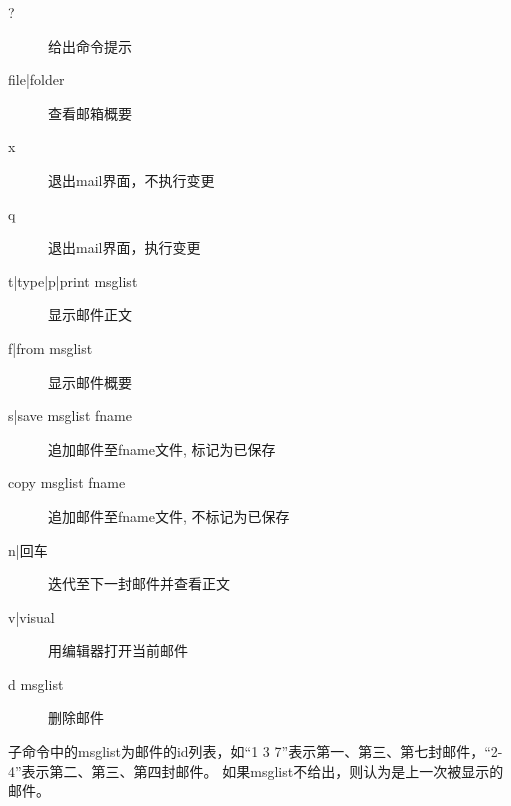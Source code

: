\begin{description}
  \item [?] 给出命令提示 
  \item [file|folder] 查看邮箱概要
  \item [x] 退出mail界面，不执行变更 
  \item [q] 退出mail界面，执行变更 
  \item [t|type|p|print msglist] 显示邮件正文 
  \item [f|from msglist] 显示邮件概要
  \item [s|save msglist fname] 追加邮件至fname文件, 标记为已保存
  \item [copy msglist fname] 追加邮件至fname文件, 不标记为已保存
  \item [n|回车] 迭代至下一封邮件并查看正文 
  \item [v|visual] 用编辑器打开当前邮件 
  \item [d msglist] 删除邮件 

\end{description}

子命令中的msglist为邮件的id列表，如“1 3 7”表示第一、第三、第七封邮件，“2-4”表示第二、第三、第四封邮件。
如果msglist不给出，则认为是上一次被显示的邮件。



























